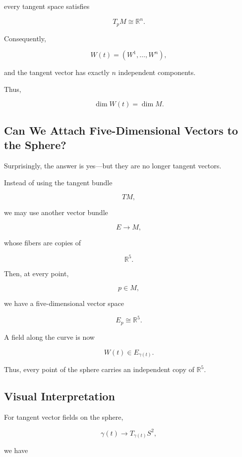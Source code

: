 \documentclass[12pt,a4paper]{article}
\theoremstyle{notespace}
\begin{document}
every tangent space satisfies

\[
\boxed{
	T_pM\cong\mathbb R^n.
}
\]

Consequently,

\[
\boxed{
	W(t)
	=
	\left(
	W^1,\ldots,W^n
	\right),
}
\]

and the tangent vector has exactly \(n\) independent components.

Thus,

\[
\boxed{
	\dim W(t)=\dim M.
}
\]


\subsection{Can We Attach Five-Dimensional Vectors to the Sphere?}

Surprisingly, the answer is yes—but they are no longer tangent vectors.

Instead of using the tangent bundle

\[
TM,
\]

we may use another vector bundle

\[
E
\longrightarrow
M,
\]

whose fibers are copies of

\[
\mathbb R^5.
\]

Then, at every point,

\[
p\in M,
\]

we have a five-dimensional vector space

\[
E_p
\cong
\mathbb R^5.
\]

A field along the curve is now

\[
\boxed{
	W(t)\in E_{\gamma(t)}.
}
\]

Thus, every point of the sphere carries an independent copy of
\(\mathbb R^5\).


\subsection{Visual Interpretation}

For tangent vector fields on the sphere,

\[
\gamma(t)
\longrightarrow
T_{\gamma(t)}S^2,
\]

we have
\end{document}
